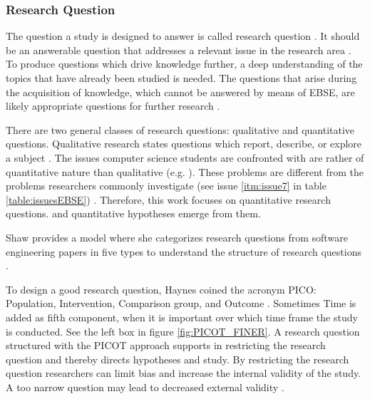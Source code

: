 
\subsubsection{Research Question}

The question a study is designed to answer is called research question \cite{Vickers}. It should be an answerable question that addresses a relevant issue in the research area \cite{Dyba2005}. To produce questions which drive knowledge further, a deep understanding of the topics that have already been studied is needed.
The questions that arise during the acquisition of knowledge, which cannot be answered by means of EBSE, are likely appropriate questions for further research \cite{Farrugia2009}.

There are two general classes of research questions: qualitative and quantitative questions. Qualitative research states questions which report, describe, or explore a subject \cite[p. 139-141]{Creswell2014}. The issues computer science students are confronted with are rather of quantitative nature than qualitative (e.g. ). These problems are different from the problems researchers commonly investigate (see issue \ref{itm:issue7} in table \ref{table:issuesEBSE}) \cite{Rainer2006}. Therefore, this work focuses on quantitative research questions.  \cite[p. 143]{Creswell2014} and quantitative hypotheses emerge from them.

Shaw provides a model where she categorizes research questions from software engineering papers in five types to understand the structure of research questions \cite{Shaw2002}. 

To design a good research question, Haynes coined the acronym PICO: Population, Intervention, Comparison group, and Outcome \cite{BrianHaynes2006}. Sometimes Time is added as fifth component, when it is important over which time frame the study is conducted. See the left box in figure \ref{fig:PICOT_FINER}. A research question structured with the PICOT approach supports in restricting the research question and thereby directs hypotheses and study. By restricting the research question researchers can limit bias and increase the internal validity of the study. A too narrow question may lead to decreased external validity \cite{Farrugia2009}. 


